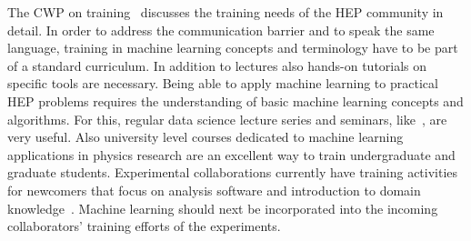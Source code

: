 The CWP on training~\cite{HSF-CWP-2017-02} discusses the training needs of the HEP community in detail.
In order to address the communication barrier and to speak the same language, training in machine learning concepts and terminology have to be part of a standard curriculum.
In addition to lectures also hands-on tutorials on specific tools are necessary.
Being able to apply machine learning to practical HEP problems requires the understanding of basic machine learning concepts and algorithms.
For this, regular data science lecture series and seminars, like~\cite{mlhep}, are very useful.
Also university level courses dedicated to machine learning applications in physics research are an excellent way to train undergraduate and graduate students.
%
Experimental collaborations currently have training activities for newcomers that focus on analysis software and introduction to domain knowledge~\cite{2016chep.confE.334B}.
Machine learning should next be incorporated into the incoming collaborators' training efforts of the experiments.
